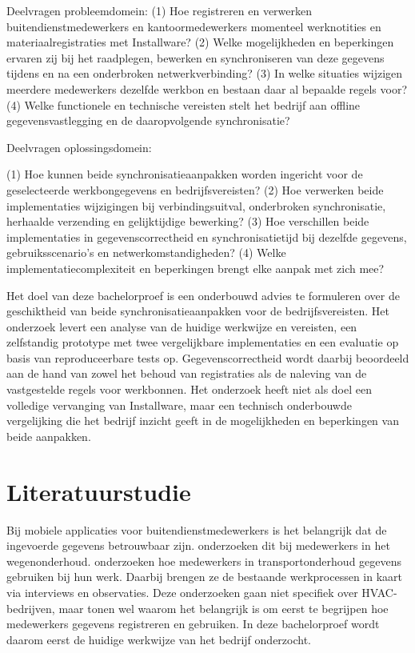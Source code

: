 Deelvragen probleemdomein:
(1) Hoe registreren en verwerken buitendienstmedewerkers en kantoormedewerkers momenteel werknotities en materiaalregistraties met Installware?
(2) Welke mogelijkheden en beperkingen ervaren zij bij het raadplegen, bewerken en synchroniseren van deze gegevens tijdens en na een onderbroken netwerkverbinding?
(3) In welke situaties wijzigen meerdere medewerkers dezelfde werkbon en bestaan daar al bepaalde regels voor?
(4) Welke functionele en technische vereisten stelt het bedrijf aan offline gegevensvastlegging en de daaropvolgende synchronisatie?

Deelvragen oplossingsdomein:

(1) Hoe kunnen beide synchronisatieaanpakken worden ingericht voor de geselecteerde werkbongegevens en bedrijfsvereisten?
(2) Hoe verwerken beide implementaties wijzigingen bij verbindingsuitval, onderbroken synchronisatie, herhaalde verzending en gelijktijdige bewerking?
(3) Hoe verschillen beide implementaties in gegevenscorrectheid en synchronisatietijd bij dezelfde gegevens, gebruiksscenario’s en netwerkomstandigheden?
(4) Welke implementatiecomplexiteit en beperkingen brengt elke aanpak met zich mee?

Het doel van deze bachelorproef is een onderbouwd advies te formuleren over de geschiktheid van beide synchronisatieaanpakken
voor de bedrijfsvereisten. Het onderzoek levert een analyse van de huidige werkwijze en vereisten, een zelfstandig prototype met
twee vergelijkbare implementaties en een evaluatie op basis van reproduceerbare tests op.
Gegevenscorrectheid wordt daarbij beoordeeld aan de hand van zowel het behoud van registraties als de naleving
van de vastgestelde regels voor werkbonnen. Het onderzoek heeft niet als doel een volledige vervanging van Installware,
maar een technisch onderbouwde vergelijking die het bedrijf inzicht geeft in de mogelijkheden en beperkingen van beide aanpakken.


\section{Literatuurstudie}%
\label{sec:literatuurstudie}

Bij mobiele applicaties voor buitendienstmedewerkers is het belangrijk dat de ingevoerde gegevens betrouwbaar zijn.
\textcite{KnowlesEtAl2014} onderzoeken dit bij medewerkers in het wegenonderhoud. \textcite{HardingEtAl2019} onderzoeken
hoe medewerkers in transportonderhoud gegevens gebruiken bij hun werk. Daarbij brengen ze de bestaande werkprocessen in kaart
via interviews en observaties. Deze onderzoeken gaan niet specifiek over HVAC-bedrijven, maar tonen wel waarom het belangrijk is om
eerst te begrijpen hoe medewerkers gegevens registreren en gebruiken. In deze bachelorproef wordt daarom eerst de huidige
werkwijze van het bedrijf onderzocht.

